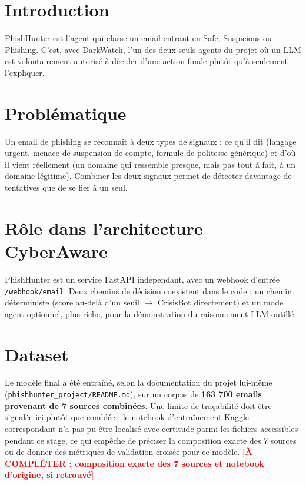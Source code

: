 \documentclass[12pt,a4paper]{report}
\newcommand{\TODO}[1]{\textcolor{red}{\textbf{[À COMPLÉTER : #1]}}}
\begin{document}
\section{Introduction}

PhishHunter est l'agent qui classe un email entrant en Safe, Suspicious ou Phishing. C'est, avec DarkWatch, l'un des deux seuls agents du projet où un LLM est volontairement autorisé à décider d'une action finale plutôt qu'à seulement l'expliquer.

\section{Problématique}

Un email de phishing se reconnaît à deux types de signaux : ce qu'il dit (langage urgent, menace de suspension de compte, formule de politesse générique) et d'où il vient réellement (un domaine qui ressemble presque, mais pas tout à fait, à un domaine légitime). Combiner les deux signaux permet de détecter davantage de tentatives que de se fier à un seul.

\section{Rôle dans l'architecture CyberAware}

PhishHunter est un service FastAPI indépendant, avec un webhook d'entrée \texttt{/webhook/email}. Deux chemins de décision coexistent dans le code : un chemin déterministe (score au-delà d'un seuil $\rightarrow$ CrisisBot directement) et un mode agent optionnel, plus riche, pour la démonstration du raisonnement LLM outillé.

\section{Dataset}

Le modèle final a été entraîné, selon la documentation du projet lui-même (\texttt{phishhunter\_project/README.md}), sur un corpus de \textbf{163 700 emails provenant de 7 sources combinées}. Une limite de traçabilité doit être signalée ici plutôt que comblée : le notebook d'entraînement Kaggle correspondant n'a pas pu être localisé avec certitude parmi les fichiers accessibles pendant ce stage, ce qui empêche de préciser la composition exacte des 7 sources ou de donner des métriques de validation croisée pour ce modèle. \TODO{composition exacte des 7 sources et notebook d'origine, si retrouvé}
\end{document}
